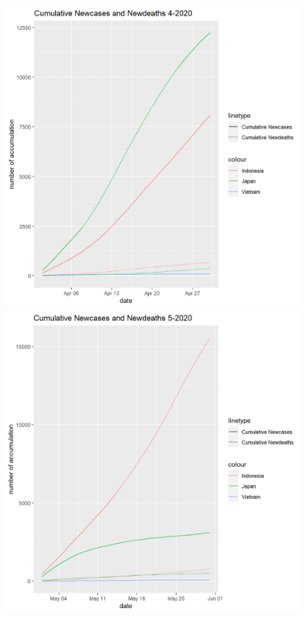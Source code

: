 \documentclass[a4paper]{article}
\theoremstyle{definition}
\begin{document}
\begin{enumerate}[1)]
\begin{figure}[H]
\begin{center}
        \includegraphics[scale=0.4]{vi/cml_new_4_2020.png}
        \includegraphics[scale=0.4]{vi/cml_new_5_2020.png}

\end{center}
\end{figure}
\end{enumerate}
\end{document}
